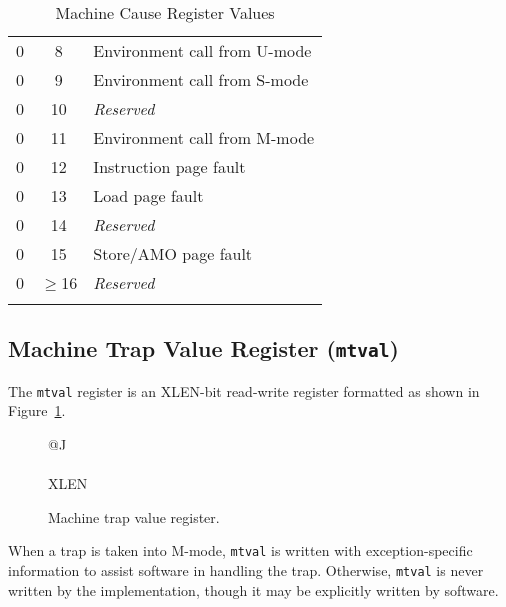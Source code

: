 \begin{longtable}[]{@{}ccl@{}}
  0         & 8               & Environment call from U-mode\\
  0         & 9               & Environment call from S-mode \\
  0         & 10              & \emph{Reserved} \\
  0         & 11              & Environment call from M-mode \\
  0         & 12              & Instruction page fault \\
  0         & 13              & Load page fault \\
  0         & 14              & \emph{Reserved} \\
  0         & 15              & Store/AMO page fault \\
  0         & $\ge$16         & \emph{Reserved} \\
\bottomrule
\caption{Machine Cause Register Values}
\label{tab:mcause-reg-values}
\end{longtable}

\fi

\subsection{Machine Trap Value Register
(\texttt{mtval})}\label{machine-trap-value-register-mtval}

The \texttt{mtval} register is an XLEN-bit read-write register formatted as shown in Figure~\ref{fig:mtvalreg}.

\ifdefined\MARKDOWN
\else
\begin{figure}[!ht]
	{\footnotesize
		\begin{center}
			\begin{tabular}{@{}J}
				 \\
				\hline
				 \\
				\hline
				XLEN \\
			\end{tabular}
		\end{center}
	}
	\vspace{-0.1in}
	\caption{Machine trap value register.}
	\label{fig:mtvalreg}
\end{figure}
\fi

When a trap is taken into M-mode, \texttt{mtval} is
written with exception-specific information to assist software in handling the
trap.  Otherwise, \texttt{mtval} is never written by the implementation, though
it may be explicitly written by software.

